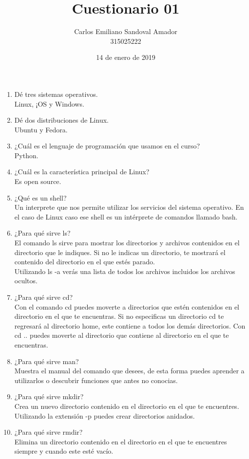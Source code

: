 \documentclass[letterpaper, 12pt, oneside]{article}%
\title{Cuestionario 01}
\author{Carlos Emiliano Sandoval Amador \\ 315025222}
\date{14 de enero de 2019}
\begin{document}
	\maketitle
	\begin{enumerate} %
		\item Dé tres sistemas operativos. \\ Linux, ¡OS y Windows.
		\item Dé dos distribuciones de Linux. \\ Ubuntu y Fedora.
		\item ¿Cuál es el lenguaje de programación que usamos en el curso? \\ Python.
		\item ¿Cuál es la característica principal de Linux? \\ Es open source.
		\item ¿Qué es un shell? \\ Un interprete que nos permite utilizar los servicios del sistema operativo. En el caso de Linux caso ese shell es un intérprete de comandos llamado bash.
		\item ¿Para qué sirve ls? \\ El comando ls sirve para mostrar los directorios y archivos contenidos en el directorio que le indiques. Si no le indicas un directorio, te mostrará el contenido del directorio en el que estés parado. \\ Utilizando ls -a verás una lista de todos los archivos incluidos los archivos ocultos.
		\item ¿Para qué sirve cd? \\ Con el comando cd puedes moverte a directorios que estén contenidos en el directorio en el que te encuentras. Si no especificas un directorio cd te regresará al directorio home, este contiene a todos los demás directorios. Con cd .. puedes moverte al directorio que contiene al directorio en el que te encuentras.
		\item ¿Para qué sirve man? \\ Muestra el manual del comando que desees, de esta forma puedes aprender a utilizarlos o descubrir funciones que antes no conocias.
		\item ¿Para qué sirve mkdir? \\ Crea un nuevo directorio contenido en el directorio en el que te encuentres. Utilizando la extensión -p puedes crear directorios anidados.
		\item ¿Para qué sirve rmdir? \\ Elimina un directorio contenido en el directorio en el que te encuentres siempre y cuando este esté vacío.

\end{enumerate}
\end{document}
